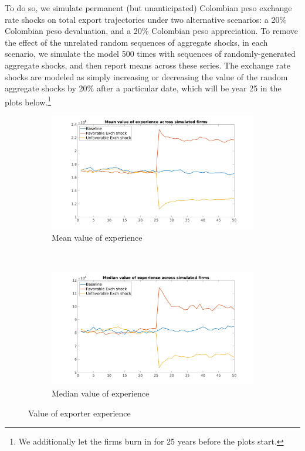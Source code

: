 \documentclass[12pt]{article}
\begin{document}
To do so, we simulate permanent (but unanticipated) Colombian peso exchange
rate shocks on total export trajectories under two alternative scenarios: a
20\% Colombian peso devaluation, and a 20\% Colombian peso appreciation. To
remove the effect of the unrelated random sequences of aggregate shocks, in
each scenario, we simulate the model 500 times with sequences of
randomly-generated aggregate shocks, and then report means across these
series. The exchange rate shocks are modeled as simply increasing or
decreasing the value of the random aggregate shocks by 20\% after a
particular date, which will be year 25 in the plots below.\footnote{%
We additionally let the firms burn in for 25 years before the plots start.} 
\begin{figure}[tbp]
\centering
\begin{subfigure}[b]{0.5\textwidth}
        \centering
        \includegraphics[width=\textwidth]{figures/intangible_value_per_firm}
        \caption{Mean value of experience}
    \end{subfigure} ~ 
\begin{subfigure}[b]{0.5\textwidth}
        \centering
        \includegraphics[width=\textwidth]{figures/intangible_value_per_firm_median}
        \caption{Median value of experience}
    \end{subfigure} \newline
\caption{Value of exporter experience}
\label{fig:avg_value}
\end{figure}
\end{document}
